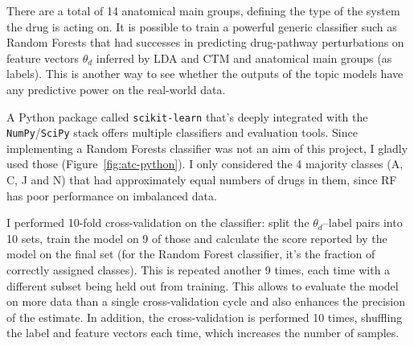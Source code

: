 \documentclass[12pt,a4paper,twoside,openright]{report}
\begin{document}
There are a total of 14 anatomical main groups, defining the type of the system the drug is acting on. It is possible to train a powerful generic classifier such as Random Forests\cite{Breiman:2001:RF:570181.570182} that had successes in predicting drug-pathway perturbations\cite{Riddick15012011} on feature vectors $\theta_d$ inferred by LDA and CTM and anatomical main groups (as labels). This is another way to see whether the outputs of the topic models have any predictive power on the real-world data.

A Python package called \texttt{scikit-learn} \cite{scikit-learn} that's deeply integrated with the \texttt{NumPy}/\texttt{SciPy} stack offers multiple classifiers and evaluation tools. Since implementing a Random Forests classifier was not an aim of this project, I gladly used those (Figure~\ref{fig:atc-python}). I only considered the 4 majority classes (A, C, J and N) that had approximately equal numbers of drugs in them, since RF has poor performance on imbalanced data.

I performed 10-fold cross-validation on the classifier: split the $\theta_d$--label pairs into 10 sets, train the model on 9 of those and calculate the score reported by the model on the final set (for the Random Forest classifier, it's the fraction of correctly assigned classes). This is repeated another 9 times, each time with a different subset being held out from training. This allows to evaluate the model on more data than a single cross-validation cycle and also enhances the precision of the estimate. In addition, the cross-validation is performed 10 times, shuffling the label and feature vectors each time, which increases the number of samples.
\end{document}

